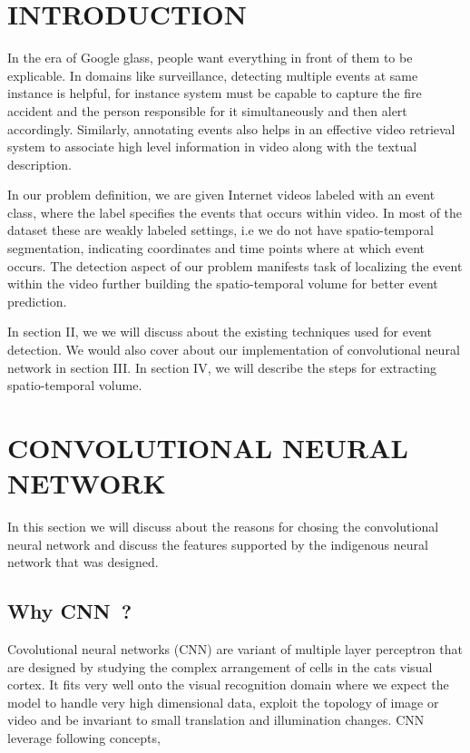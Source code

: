 \documentclass[MTech]{iitmdiss}
\begin{document}




 \chapter{INTRODUCTION}
 \label{chap:intro}
 In the era of Google glass, people want everything in front of them to be explicable. In domains like surveillance, detecting multiple events at same instance is helpful, for instance system must be capable to capture the fire accident and the person responsible for it simultaneously and then alert accordingly. Similarly, annotating events also helps in an effective video retrieval system to associate high level information in video along with the textual description.
\par In our problem definition, we are given Internet  videos labeled with an event class, where the label specifies the events that occurs within video. In most of the dataset these are weakly labeled settings, i.e we do not have spatio-temporal segmentation, indicating coordinates and time points where at  which event occurs.  The detection aspect of our problem manifests task of localizing the event within the video further building the spatio-temporal volume for better event prediction.
\par In section II, we we will discuss about the existing techniques used for event detection. We would also cover about our implementation of convolutional neural network in section III. In section IV, we will describe the steps for extracting spatio-temporal volume.

 \chapter{CONVOLUTIONAL NEURAL NETWORK}
 In this section we will discuss about the reasons for chosing the convolutional neural network and discuss the features supported by the indigenous neural network that was designed.
 \section{Why CNN~?}
 Covolutional neural networks (CNN) are variant of multiple layer perceptron that are designed by studying the complex arrangement of cells in the cats visual cortex. It fits very well onto the visual recognition domain where we expect the model to handle very high dimensional data, exploit the topology of image or video and be invariant to small translation and illumination changes. CNN leverage following concepts,
\end{document}
